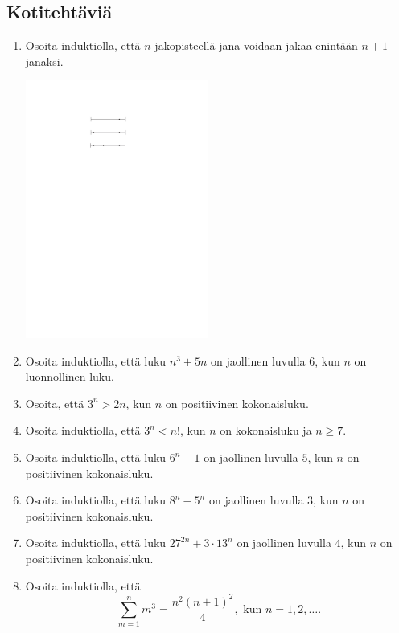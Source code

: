 \subsection*{Kotitehtäviä}

\begin{enumerate}

\item Osoita induktiolla, että $n$ jakopisteellä jana voidaan jakaa enintään $n + 1$ janaksi.

\begin{center}
\includegraphics[width=6cm]{pictures/Kappale5_4_janat_v2}
\end{center}

\item Osoita induktiolla, että luku $n^3 + 5n$ on jaollinen luvulla $6$, kun $n$ on luonnollinen luku.

\item Osoita, että $3^n > 2n$, kun $n$ on positiivinen kokonaisluku.

\item Osoita induktiolla, että $3^n < n!$, kun $n$ on kokonaisluku ja $n\ge 7$.

\item Osoita induktiolla, että luku $6^n - 1$ on jaollinen luvulla $5$, kun $n$ on positiivinen kokonaisluku.

\item Osoita induktiolla, että luku $8^n - 5^n$ on jaollinen luvulla $3$, kun $n$ on positiivinen kokonaisluku.

\item Osoita induktiolla, että luku $27^{2n} + 3 \cdot 13^{n}$ on jaollinen luvulla $4$, kun $n$ on positiivinen kokonaisluku.

\item 
Osoita induktiolla, että
\[
\sum_{m=1}^n m^3= \frac{n^2(n+1)^2}{4}, \textrm{ kun } n=1, 2, \ldots.
\]


\end{enumerate}
